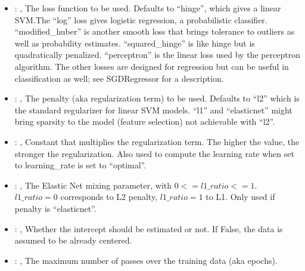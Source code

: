 \begin{itemize}
    \item {}: , 
      The loss function to be used. Defaults to ``hinge'', which gives a linear SVM.The ``log'' loss
      gives logistic regression, a                                                  probabilistic
      classifier. ``modified\_huber'' is another smooth loss that brings tolerance to outliers as
      well as probability estimates.
      ``squared\_hinge'' is like hinge but is quadratically penalized. ``perceptron'' is the linear
      loss used by the perceptron algorithm.                                                  The
      other losses are designed for regression but can be useful in classification as well; see
      SGDRegressor for a description.

    \item {}: \xmlDesc{[l2, l1, elasticnet]}, 
      The penalty (aka regularization term) to be used. Defaults to ``l2'' which is the standard
      regularizer for linear SVM models.                                                  ``l1'' and
      ``elasticnet'' might bring sparsity to the model (feature selection) not achievable with
      ``l2''.

    \item {}: , 
      Constant that multiplies the regularization term. The higher the value, the stronger the
      regularization. Also used to compute                                                  the
      learning rate when set to learning\_rate is set to ``optimal''.

    \item {}: , 
      The Elastic Net mixing parameter, with $0 <= l1\_ratio <= 1$. $l1\_ratio=0$ corresponds to L2
      penalty, $l1\_ratio=1$ to L1.                                                  Only used if
      penalty is ``elasticnet''.

    \item {}: , 
      Whether the intercept should be estimated or not. If False,
      the data is assumed to be already centered.

    \item {}: , 
      The maximum number of passes over the training data (aka epochs).


\end{itemize}
